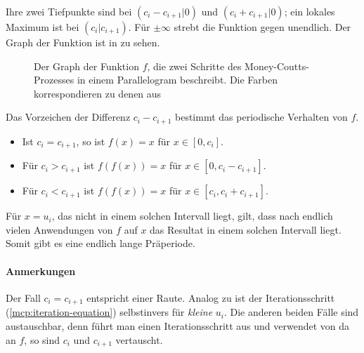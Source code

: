 Ihre zwei Tiefpunkte sind bei $(c_i-c_{i+1}|0)$ und $(c_i+c_{i+1}|0)$;
ein lokales Maximum ist bei $(c_i|c_{i+1})$.
Für $\pm\infty$ strebt die Funktion gegen unendlich.
Der Graph der Funktion ist in  zu sehen.

\begin{figure}
    
    \caption{Der Graph der Funktion $f$, die zwei Schritte des Money-Coutts-Prozesses in einem Parallelogram beschreibt.
        Die Farben korrespondieren zu denen aus }
    \label{parallogram:function-graph}
\end{figure}

Das Vorzeichen der Differenz $c_i - c_{i+1}$ bestimmt das periodische Verhalten von $f$.
\begin{itemize}
    \item Ist $c_i=c_{i+1}$, so ist $f(x)=x$ für $x\in[0,c_i]$.
    \item Für $c_i>c_{i+1}$ ist $f(f(x))=x$ für $x\in[0,c_i-c_{i+1}]$.
    \item Für $c_i<c_{i+1}$ ist $f(f(x))=x$ für $x\in[c_i,c_i+c_{i+1}]$.
\end{itemize}

Für $x=u_i$, das nicht in einem solchen Intervall liegt, gilt,
dass nach endlich vielen Anwendungen von $f$ auf $x$ das Resultat in einem solchen Intervall liegt.
Somit gibt es eine endlich lange Präperiode.

\paragraph{Anmerkungen}
Der Fall $c_i=c_{i+1}$ entspricht einer Raute.
Analog zu  ist der Iterationsschritt (\ref{mcp:iteration-equation}) selbstinvers für \emph{kleine} $u_i$.
Die anderen beiden Fälle sind austauschbar, denn führt man einen Iterationsschritt aus und verwendet von da an $f$,
so sind $c_i$ und $c_{i+1}$ vertauscht.
